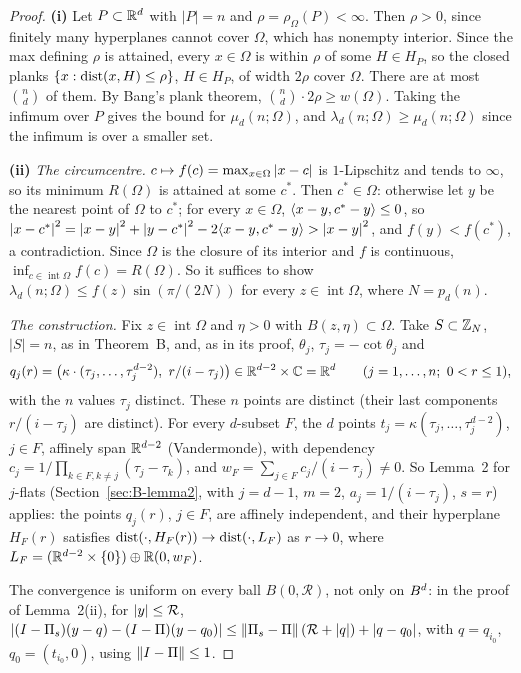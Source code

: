 \begin{proof}
\textbf{(i)} Let $P\subset\mathbb{R}^d$ with $|P|=n$ and $\rho=\rho_\Omega(P)<\infty$. Then $\rho>0$, since finitely
many hyperplanes cannot cover $\Omega$, which has nonempty interior. Since the max defining $\rho$ is attained,
every $x\in \Omega$ is within $\rho$ of some $H\in H_P$, so the closed planks $\{x:\operatorname{dist}(x,H)\le\rho\}$,
$H\in H_P$, of width $2\rho$ cover $\Omega$. There are at most $\binom nd$ of them. By Bang's plank theorem,
$\binom nd\cdot2\rho\ge w(\Omega)$. Taking the infimum over $P$ gives the bound for $\mu_d(n;\Omega)$, and
$\lambda_d(n;\Omega)\ge\mu_d(n;\Omega)$ since the infimum is over a smaller set.

\textbf{(ii)} \emph{The circumcentre.} $c\mapsto f(c)=\max_{x\in \Omega}\left|x-c\right|$ is $1$-Lipschitz and tends
to $\infty$, so its minimum $R(\Omega)$ is attained at some $c^*$. Then $c^*\in \Omega$: otherwise let $y$ be the
nearest point of $\Omega$ to $c^*$; for every $x\in \Omega$, $\langle x-y,c^*-y\rangle\le0$, so
$\left|x-c^*\right|^2=\left|x-y\right|^2+\left|y-c^*\right|^2-2\langle x-y,c^*-y\rangle>\left|x-y\right|^2$, and $f(y)<f(c^*)$, a
contradiction. Since $\Omega$ is the closure of its interior and $f$ is continuous,
$\inf_{c\in\operatorname{int}\Omega}f(c)=R(\Omega)$. So it suffices to show
$\lambda_d(n;\Omega)\le f(z)\sin(\pi/(2N))$ for every $z\in\operatorname{int}\Omega$, where $N=p_d(n)$.

\emph{The construction.} Fix $z\in\operatorname{int}\Omega$ and $\eta>0$ with $B(z,\eta)\subset \Omega$. Take
$S\subset\mathbb{Z}_N$, $|S|=n$, as in Theorem~B, and, as in its proof, $\theta_j$, $\tau_j=-\cot\theta_j$ and
\[
  q_j(r)=\bigl(\kappa\cdot(\tau_j,\dots,\tau_j^{d-2}),\ r/(i-\tau_j)\bigr)\in\R^{d-2}\times\mathbb C=\R^d
  \qquad(j=1,\dots,n;\ 0<r\le1),
\]
with the $n$ values $\tau_j$ distinct. These $n$ points are distinct (their last components
$r/(i-\tau_j)$ are distinct). For every $d$-subset $F$, the $d$ points
$t_j=\kappa(\tau_j,\dots,\tau_j^{d-2})$, $j\in F$, affinely span $\mathbb{R}^{d-2}$ (Vandermonde), with dependency
$c_j=1/\prod_{k\in F,k\ne j}(\tau_j-\tau_k)$, and $w_F=\sum_{j\in F}c_j/(i-\tau_j)\ne0$. So Lemma~2 for
$j$-flats (Section~\ref{sec:B-lemma2}, with $j=d-1$, $m=2$, $a_j=1/(i-\tau_j)$, $s=r$) applies: the
points $q_j(r)$, $j\in F$, are affinely independent, and their hyperplane $H_F(r)$ satisfies
$\operatorname{dist}(\cdot,H_F(r))\to\operatorname{dist}(\cdot,L_F)$ as $r\to0$, where $L_F=(\mathbb{R}^{d-2}\times\{0\})\oplus\mathbb{R}(0,w_F)$.

The convergence is uniform on every ball $B(0,\mathcal R)$, not only on $B^d$: in the proof of
Lemma~2(ii), for $\left|y\right|\le\mathcal R$,
$\left|(I-\Pi_s)(y-q)-(I-\Pi)(y-q_0)\right|\le\left\|\Pi_s-\Pi\right\|(\mathcal R+\left|q\right|)+\left|q-q_0\right|$, with
$q=q_{i_0}$, $q_0=(t_{i_0},0)$, using $\left\|I-\Pi\right\|\le1$.


\end{proof}
